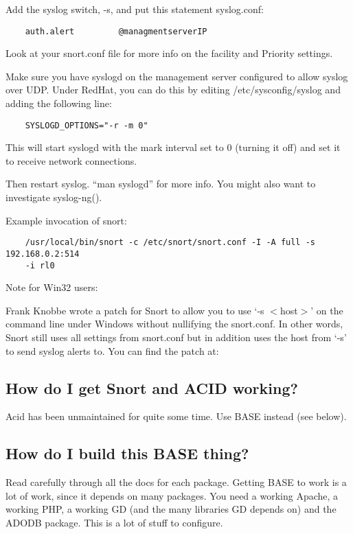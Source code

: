 \documentclass{article}
\begin{document}
Add the syslog switch, -s, and put this statement syslog.conf:
\begin{verbatim}
    auth.alert         @managmentserverIP
\end{verbatim}

Look at your snort.conf file for more info on the facility and Priority
settings.

Make sure you have syslogd on the management server configured to allow syslog over
UDP. Under RedHat, you can do this by editing /etc/sysconfig/syslog and adding
the following line:
\begin{verbatim}
    SYSLOGD_OPTIONS="-r -m 0"
\end{verbatim}
This will start syslogd with the mark interval set to 0 (turning it off) and
set it to receive network connections.

Then restart syslog. ``man syslogd'' for more info. You might also want to
investigate syslog-ng\linebreak ().

Example invocation of snort:
\begin{verbatim}
    /usr/local/bin/snort -c /etc/snort/snort.conf -I -A full -s 192.168.0.2:514
    -i rl0
\end{verbatim}
Note for Win32 users:

Frank Knobbe wrote a patch for Snort to allow you to use `-s $<$host$>$' on the
command line under Windows without nullifying the snort.conf. In other words,
Snort still uses all settings from snort.conf but in addition uses the host
from `-s' to send syslog alerts to. You can find the patch at:


\subsection{How do I get Snort and ACID working?}

Acid has been unmaintained for quite some time. Use BASE instead (see below).

\subsection{How do I build this BASE thing?}

Read carefully through all the docs for each package. Getting BASE to work is a
lot of work, since it depends on many packages. You need a working Apache, a
working PHP, a working GD (and the many libraries GD depends on) and the ADODB
package. This is a lot of stuff to configure.
\end{document}
